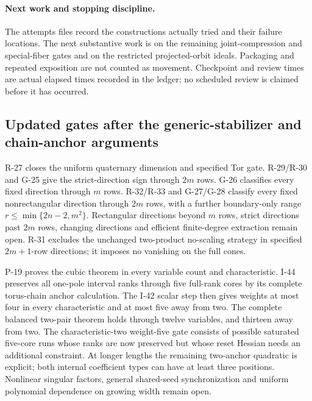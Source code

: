 \paragraph{Next work and stopping discipline.}
The attempts files record the constructions actually tried and their failure locations. The next substantive work is on the remaining joint-compression and special-fiber gates and on the restricted projected-orbit ideals. Packaging and repeated exposition are not counted as movement. Checkpoint and review times are actual elapsed times recorded in the ledger; no scheduled review is claimed before it has occurred.


\subsection{Updated gates after the generic-stabilizer and chain-anchor arguments}
R-27 closes the uniform quaternary dimension and specified Tor gate.
R-29/R-30 and G-25 give the strict-direction sign through
$2m$ rows. G-26 classifies every fixed direction through
$m$ rows. R-32/R-33 and G-27/G-28 classify every fixed
nonrectangular direction through $2m$ rows, with a further
boundary-only range $r\le\min\{2n-2,m^2\}$.
Rectangular directions beyond $m$ rows, strict directions
past $2m$ rows, changing directions and efficient finite-degree
extraction remain open. R-31 excludes the unchanged two-product
no-scaling strategy in specified $2m+1$-row directions;
it imposes no vanishing on the full cones.

P-19 proves the cubic theorem in every variable count and
characteristic. I-44 preserves all one-pole interval ranks
through five full-rank cores by its complete torus-chain
anchor calculation. The I-42 scalar step then gives weights
at most four in every characteristic and at most five away
from two. The complete balanced two-pair theorem holds
through twelve variables, and thirteen away from two.
The characteristic-two weight-five gate consists of possible
saturated five-core runs whose ranks are now preserved but
whose reset Hessian needs an additional constraint.
At longer lengths the remaining two-anchor quadratic is
explicit; both internal coefficient types can have at least
three positions. Nonlinear singular factors, general
shared-seed synchronization and uniform polynomial dependence
on growing width remain open.
